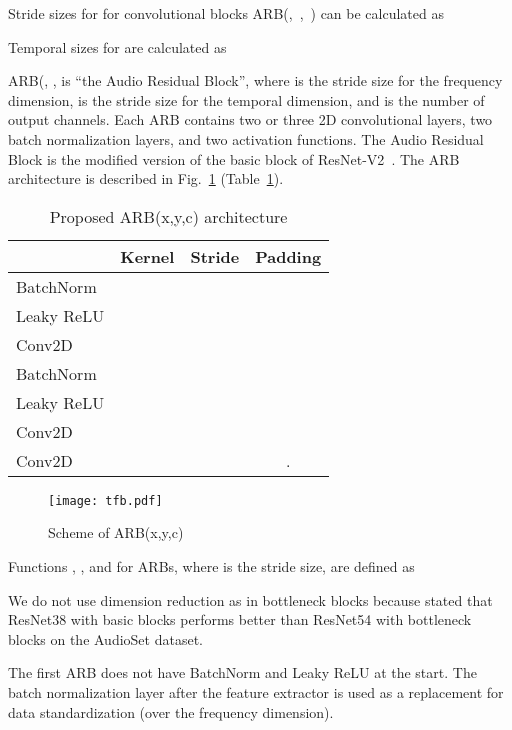 \documentclass{article}
\begin{document}
\begin{sloppy}
Stride sizes  for  for convolutional blocks \mbox{ARB(, , )} can be calculated as

Temporal sizes  for  are calculated as


ARB(, ,  is ``the Audio Residual Block'', where  is the stride size for the frequency dimension,  is the stride size for the temporal dimension, and  is the number of output channels. Each ARB contains two or three 2D convolutional layers, two batch normalization layers, and two activation functions. The Audio Residual Block is the modified version of the basic block of \mbox{ResNet-V2}~\cite{10.1007/978-3-319-46493-0_38}. The ARB architecture is described in Fig.~\ref{fig:ARB} (Table~\ref{tab:tableARB}). 
\vspace{-1.5em}
\begin{table}[h!]
  \caption{Proposed ARB(x,y,c) architecture}
  \centering
  \begin{tabular}{ l c c c }
  \hline
\textbf{}&  \textbf{Kernel}& \textbf{Stride} & 
                                         \textbf{Padding} \\
    \hline
BatchNorm &  &   &   \\ 
Leaky ReLU     &  &   &   \\ 
Conv2D    &  &   &   \\ 
BatchNorm      &  &   &   \\ 
Leaky ReLU      &  &   &   \\ 
Conv2D      &  &   &   \\ 
Conv2D      &  &   & .  \\ 
    \hline
  \end{tabular}
  
  \label{tab:tableARB}
   \vspace{-2mm} 
\end{table}

\begin{figure}[h!]
  \centering
  \centerline{\texttt{[image: tfb.pdf]}}
  \caption{Scheme of ARB(x,y,c)}
  \label{fig:ARB}
\end{figure}

Functions , , and  for ARBs, where  is the stride size, are defined as


We do not use dimension reduction as in bottleneck blocks because \cite {9229505} stated that ResNet38 with basic blocks performs better than ResNet54 with bottleneck blocks on the AudioSet dataset.

The first ARB does not have BatchNorm and Leaky ReLU at the start. The batch normalization layer after the feature extractor is used as a replacement for data standardization (over the frequency dimension). 


\end{sloppy}
\end{document}
